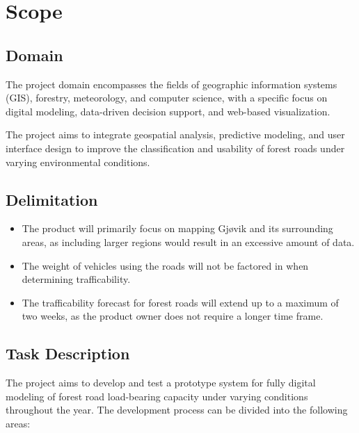 \section{Scope}

\subsection{Domain}

The project domain encompasses the fields of geographic information systems (GIS), forestry, meteorology, and computer science, with a specific focus on digital modeling, data-driven decision support, and web-based visualization. 

The project aims to integrate geospatial analysis, predictive modeling, and user interface design to improve the classification and usability of forest roads under varying environmental conditions.  

\subsection{Delimitation}

\begin{itemize}
    \item The product will primarily focus on mapping Gjøvik and its surrounding areas, as including larger regions would result in an excessive amount of data.
    \item The weight of vehicles using the roads will not be factored in when determining trafficability.
    \item The trafficability forecast for forest roads will extend up to a maximum of two weeks, as the product owner does not require a longer time frame.
\end{itemize}

\subsection{Task Description}

The project aims to develop and test a prototype system for fully digital modeling of forest road load-bearing capacity under varying conditions throughout the year. The development process can be divided into the following areas:

